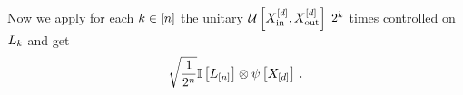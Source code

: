 Now we apply for each $k\in[n]$ the unitary $\mathcal{U}\left[X_{\mathrm{in}}^{[d]},X_{\mathrm{out}}^{[d]}\right]$ $2^{k}$ times controlled on $L_{k}$ and get
\begin{align*}
    \sqrt{\frac{1}{2^{n}}} \mathbb{I}\left[L_{[n]}\right] \otimes \psi\left[X_{[d]}\right] \, .
\end{align*}